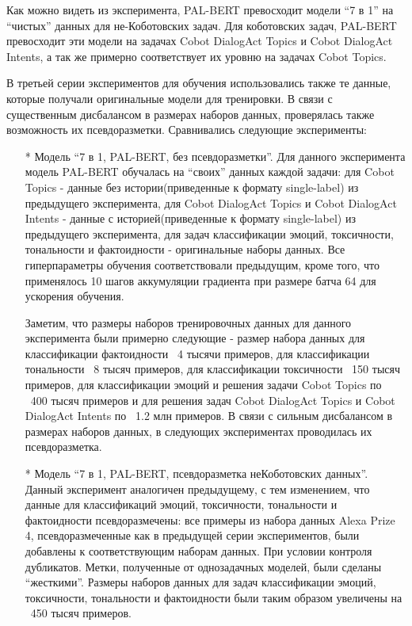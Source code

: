 Как можно видеть из эксперимента, PAL-BERT превосходит модели “7 в 1” на “чистых” данных для не-Коботовских задач. Для коботовских задач, PAL-BERT превосходит эти модели на задачах Cobot DialogAct Topics и Cobot DialogAct Intents, а так же примерно соответствует их уровню на задачах Cobot Topics.

В  третьей серии экспериментов для обучения использовались также те данные, которые получали оригинальные модели для тренировки. В связи с существенным дисбалансом в размерах наборов данных, проверялась также возможность их псевдоразметки. Сравнивались следующие эксперименты:  
\begin{itemize}
\item[*] Модель “7 в 1, PAL-BERT, без псевдоразметки”. Для данного эксперимента модель PAL-BERT обучалась на “своих” данных каждой задачи: для Cobot Topics - данные без истории(приведенные к формату single-label) из предыдущего эксперимента, для Cobot DialogAct Topics и Cobot DialogAct Intents - данные с историей(приведенные к формату single-label) из предыдущего эксперимента, для задач классификации эмоций, токсичности, тональности и фактоидности - оригинальные наборы данных. Все гиперпараметры обучения соответствовали предыдущим, кроме того, что применялось 10 шагов аккумуляции градиента при размере батча 64 для ускорения обучения.

Заметим, что размеры наборов тренировочных данных для данного эксперимента были примерно следующие - размер набора данных для классификации фактоидности ~4 тысячи примеров, для классификации тональности ~8 тысяч примеров, для классификации токсичности ~150 тысяч примеров, для классификации эмоций и решения задачи Cobot Topics по ~400 тысяч примеров и для решения задач Cobot DialogAct Topics и Cobot DialogAct Intents по ~1.2 млн примеров. В связи с сильным дисбалансом в размерах наборов данных, в следующих экспериментах проводилась их псевдоразметка.

\item[*] Модель “7 в 1, PAL-BERT, псевдоразметка неКоботовских данных”. Данный эксперимент аналогичен предыдущему, с тем изменением, что данные для классификаций эмоций, токсичности, тональности и фактоидности псевдоразмечены: все примеры из набора данных Alexa Prize 4, псевдоразмеченные как в предыдущей серии экспериментов, были добавлены к соответствующим наборам данных. При условии контроля дубликатов. Метки, полученные от однозадачных моделей, были сделаны “жесткими”. Размеры наборов данных для задач классификации эмоций, токсичности, тональности и фактоидности были таким образом увеличены на ~450 тысяч примеров. 


\end{itemize}
